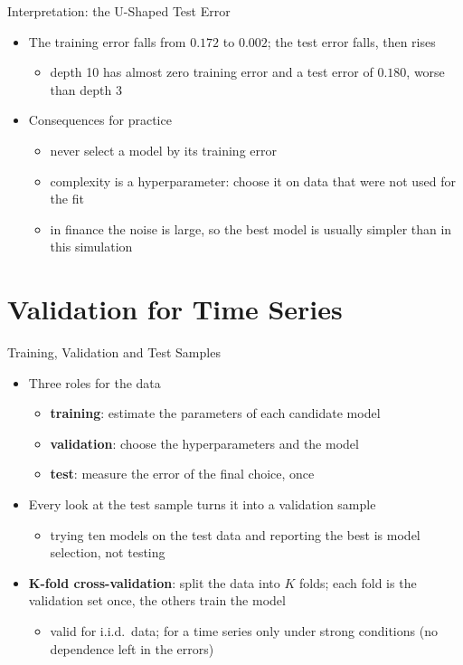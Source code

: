 \begin{frame}{Interpretation: the U-Shaped Test Error}
\itemsize{\small}
\begin{itemize}
    \item The training error falls from $0.172$ to $0.002$; the test error falls, then rises
    \begin{itemize}
        \item depth 10 has almost zero training error and a test error of $0.180$, worse than depth 3
    \end{itemize}
    \item Consequences for practice
    \begin{itemize}
        \item never select a model by its training error
        \item complexity is a hyperparameter: choose it on data that were not used for the fit
        \item in finance the noise is large, so the best model is usually simpler than in this simulation
    \end{itemize}
\end{itemize}
\end{frame}


\section{Validation for Time Series}

\begin{frame}{Training, Validation and Test Samples}
\itemsize{\small}
\begin{itemize}
    \item Three roles for the data
    \begin{itemize}
        \item \textbf{training}: estimate the parameters of each candidate model
        \item \textbf{validation}: choose the hyperparameters and the model
        \item \textbf{test}: measure the error of the final choice, once
    \end{itemize}
    \item Every look at the test sample turns it into a validation sample
    \begin{itemize}
        \item trying ten models on the test data and reporting the best is model selection, not testing
    \end{itemize}
    \item \textbf{K-fold cross-validation}: split the data into $K$ folds; each fold is the validation set once, the others train the model
    \begin{itemize}
        \item valid for i.i.d.\ data; for a time series only under strong conditions (no dependence left in the errors) 
    \end{itemize}
\end{itemize}
\end{frame}

